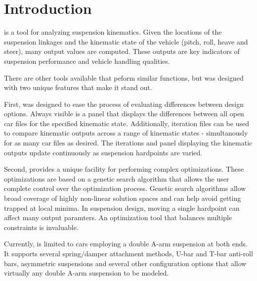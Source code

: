 \chapter{Introduction} \label{ch:introduction}


\vvase{} is a tool for analyzing suspension kinematics.  Given the locations of the suspension linkages and the kinematic state of the vehicle (pitch, roll, heave and steer), many output values are computed.  These outputs are key indicators of suspension performance and vehicle handling qualities.

There are other tools available that peform similar functions, but \vvase{} was designed with two unique features that make it stand out.

First, \vvase{} was designed to ease the process of evaluating differences between design options.  Always visible is a panel that displays the differences between all open car files for the specified kinematic state.  Additionally, iteration files can be used to compare kinematic outputs across a range of kinematic states - simultanously for as many car files as desired.  The iterations and panel displaying the kinematic outputs update continuously as suspension hardpoints are varied.

Second, \vvase{} provides a unique facility for performing complex optimizations.  These optimizations are based on a genetic search algorithm that allows the user complete control over the optimization process.  Genetic search algorithms allow broad coverage of highly non-linear solution spaces and can help avoid getting trapped at local minima.  In suspension design, moving a single hardpoint can affect many output paramters.  An optimization tool that balances multiple constraints is invaluable.

Currently, \vvase{} is limited to cars employing a double A-arm suspension at both ends.  It supports several spring/damper attachment methods, U-bar and T-bar anti-roll bars, asymmetric suspensions and several other configuration options that allow virtually any double A-arm suspension to be modeled.
